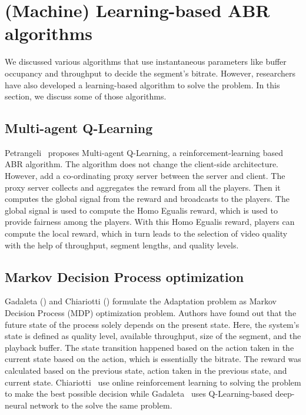 \section{(Machine) Learning-based ABR algorithms}
We discussed various algorithms that use instantaneous parameters like buffer occupancy and throughput to decide the segment's bitrate. However, researchers have also developed a learning-based algorithm to solve the problem. In this section, we discuss some of those algorithms.

\subsection{Multi-agent Q-Learning}
Petrangeli \etal\ proposes Multi-agent Q-Learning\cite{6838245}, a reinforcement-learning based ABR algorithm. The algorithm does not change the client-side architecture. However, add a co-ordinating proxy server between the server and client. The proxy server collects and aggregates the reward from all the players. Then it computes the global signal from the reward and broadcasts to the players. The global signal is used to compute the Homo Egualis\cite{10.5555/1402298.1402344} reward, which is used to provide fairness among the players. With this Homo Egualis reward, players can compute the local reward, which in turn leads to the selection of video quality with the help of throughput, segment lengths, and quality levels.

\subsection{Markov Decision Process optimization}
Gadaleta \etal(\cite{8048013}) and Chiariotti \etal(\cite{10.1145/2910017.2910603}) formulate the Adaptation problem as Markov Decision Process (MDP)\cite{P-1066} optimization problem. Authors have found out that the future state of the process solely depends on the present state. Here, the system's state is defined as quality level, available throughput, size of the segment, and the playback buffer. The state transition happened based on the action taken in the current state based on the action, which is essentially the bitrate. The reward was calculated based on the previous state, action taken in the previous state, and current state. Chiariotti \etal\ use online reinforcement learning to solving the problem to make the best possible decision while Gadaleta \etal\ uses Q-Learning-based deep-neural network to the solve the same problem.

